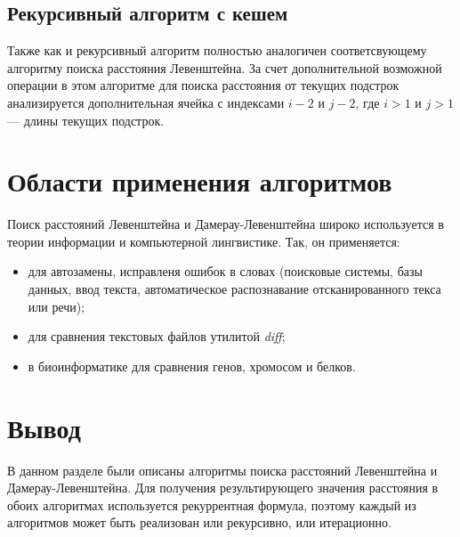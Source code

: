 \subsection{Рекурсивный алгоритм с кешем}

Также как и рекурсивный алгоритм полностью аналогичен соответсвующему алгоритму
поиска расстояния Левенштейна. За счет дополнительной возможной операции
в этом алгоритме для поиска расстояния от текущих подстрок анализируется 
дополнительная ячейка с индексами $i - 2$ и $j - 2$, где $i > 1$ и $j > 1$ ---
длины текущих подстрок.

\section{Области применения алгоритмов}

Поиск расстояний Левенштейна и Дамерау-Левенштейна широко используется в теории
информации и компьютерной лингвистике. Так, он применяется:
\begin{itemize}
    \item для автозамены, исправленя ошибок в словах (поисковые системы, базы
          данных, ввод текста, автоматическое распознавание отсканированного
          текса или речи);
    \item для сравнения текстовых файлов утилитой \textit{diff};
    \item в биоинформатике для сравнения генов, хромосом и белков.
\end{itemize}

\section{Вывод}

В данном разделе были описаны алгоритмы поиска расстояний Левенштейна и
Дамерау-Левенштейна. Для получения результирующего значения расстояния в обоих
алгоритмах используется рекуррентная формула, поэтому каждый из алгоритмов
может быть реализован или рекурсивно, или итерационно.
